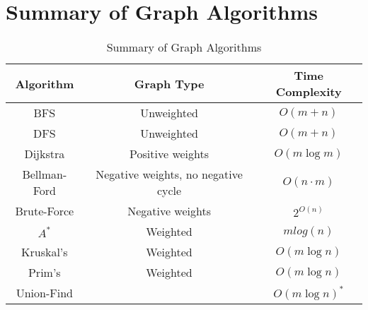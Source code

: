 \documentclass{article}
\begin{document}
\section{Summary of Graph Algorithms}
\begin{table}[h!]
\centering
\begin{tabular}{|c|c|c|}
\hline
\textbf{Algorithm} & \textbf{Graph Type} & \textbf{Time Complexity} \\
\hline
BFS & Unweighted & \( O(m + n) \) \\
\hline
DFS & Unweighted & \( O(m + n) \)\\
\hline
Dijkstra & Positive weights & \( O(m \log m) \) \\
\hline
Bellman-Ford & Negative weights, no negative cycle & \( O(n \cdot m) \) \\
\hline
Brute-Force & Negative weights & \( 2^{O(n)} \) \\
\hline
$A^*$ &Weighted& $mlog( n )$ \\
\hline
Kruskal's &Weighted& \( O(m \log n) \) \\
\hline
Prim's  &Weighted& \( O(m \log n) \) \\
\hline
Union-Find  && \( O(m \log n)^* \) \\
\hline
\end{tabular}
\caption{Summary of Graph Algorithms}
\end{table}
\end{document}
